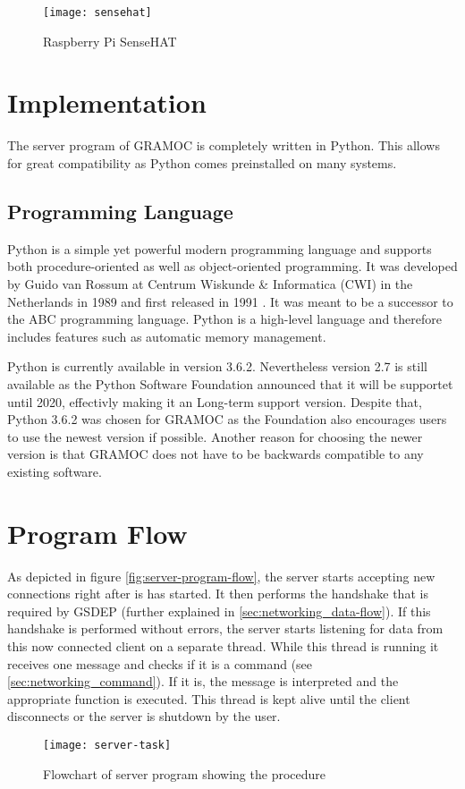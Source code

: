 \begin{figure}[H]
	\centering
	\texttt{[image: sensehat]}
	\caption[Raspberry Pi SenseHAT]{Raspberry Pi SenseHAT\footnotemark}
	\label{fig:sensehat}
\end{figure}


\section{Implementation}

The server program of GRAMOC is completely written in Python. This allows for great compatibility as Python comes preinstalled on many systems.

\subsection{Programming Language}

Python is a simple yet powerful modern programming language and supports both procedure-oriented as well as object-oriented programming. It was developed by Guido van Rossum at Centrum Wiskunde \& Informatica (CWI) in the Netherlands in 1989 and first released in 1991 \autocite{HistoryOfPython}. It was meant to be a successor to the ABC programming language. Python is a high-level language and therefore includes features such as automatic memory management.

Python is currently available in version 3.6.2. Nevertheless version 2.7 is still available as the Python Software Foundation announced that it will be supportet until 2020, effectivly making it an Long-term support version. Despite that, Python 3.6.2 was chosen for GRAMOC as the Foundation also encourages users to use the newest version if possible. Another reason for choosing the newer version is that GRAMOC does not have to be backwards compatible to any existing software.

\section{Program Flow}

As depicted in figure \vref{fig:server-program-flow}, the server starts accepting new connections right after is has started. It then performs the handshake that is required by GSDEP (further explained in \vref{sec:networking_data-flow}). If this handshake is performed without errors, the server starts listening for data from this now connected client on a separate thread. While this thread is running it receives one message and checks if it is a command (see \vref{sec:networking_command}). If it is, the message is interpreted and the appropriate function is executed. This thread is kept alive until the client disconnects or the server is shutdown by the user.

\begin{figure}[H]
	\centering
	\texttt{[image: server-task]}
	\caption{Flowchart of server program showing the procedure}
	\label{fig:server-program-flow}
\end{figure}
